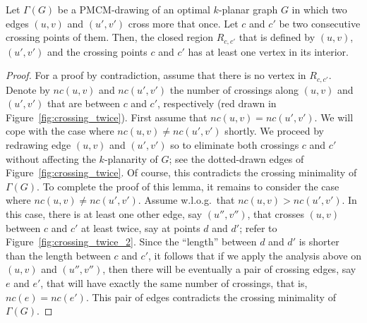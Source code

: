\begin{lemma}
Let $\Gamma(G)$ be a PMCM-drawing of an optimal $k$-planar graph $G$ in which two edges $(u,v)$ and $(u',v')$ cross more that once. Let $c$ and $c'$ be two consecutive crossing points of them. Then, the closed region $R_{c,c'}$ that is defined by $(u,v)$, $(u',v')$ and the crossing points $c$ and $c'$ has at least one vertex in its interior.
\label{lem:crossing_twice}
\end{lemma}
\begin{proof}
For a proof by contradiction, assume that there is no vertex in $R_{c,c'}$. Denote by $nc(u,v)$ and $nc(u',v')$ the number of crossings along $(u,v)$ and $(u',v')$ that are between $c$ and $c'$, respectively (red drawn in Figure~\ref{fig:crossing_twice}). First assume that $nc(u,v) = nc(u',v')$. We will cope with the case where $nc(u,v) \neq nc(u',v')$ shortly. We proceed by redrawing edge $(u,v)$ and $(u',v')$ so to eliminate both crossings $c$ and $c'$ without affecting the $k$-planarity of $G$; see the dotted-drawn edges of Figure~\ref{fig:crossing_twice}. Of course, this contradicts the crossing minimality of $\Gamma(G)$. To complete the proof of this lemma, it remains to consider the case where $nc(u,v) \neq nc(u',v')$. Assume w.l.o.g.~that $nc(u,v) > nc(u',v')$. In this case, there is at least one other edge, say $(u'',v'')$, that crosses $(u,v)$ between $c$ and $c'$ at least twice, say at points $d$ and $d'$; refer to Figure~\ref{fig:crossing_twice_2}. Since the ``length'' between $d$ and $d'$ is shorter than the length between $c$ and $c'$, it follows that if we apply the analysis above on $(u,v)$ and $(u'',v'')$, then there will be eventually a pair of crossing edges, say $e$ and $e'$, that will have exactly the same number of crossings, that is, $nc(e) = nc(e')$. This pair of edges contradicts the crossing minimality of $\Gamma(G)$.    
\end{proof}
 

